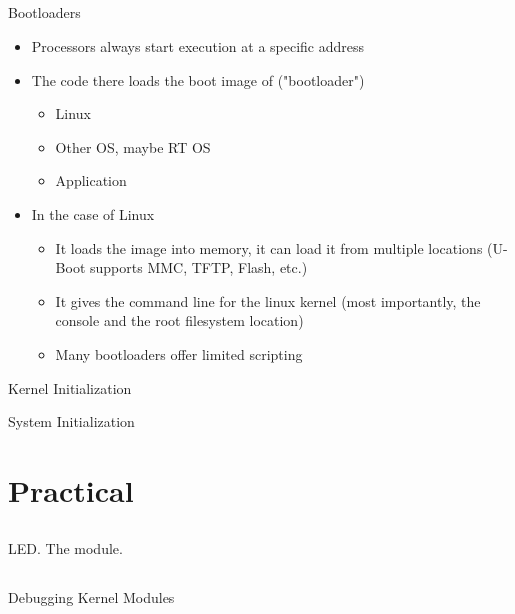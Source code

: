 \documentclass{workshop}
\begin{document}
\subsection{}
\begin{frame}{Bootloaders}
	\begin{itemize}
		\item Processors always start execution at a specific address
		\item The code there loads the boot image of ("bootloader")
			\begin{itemize}
				\item Linux
				\item Other OS, maybe RT OS
				\item Application
			\end{itemize}

		\item In the case of Linux
			\begin{itemize}
				\item It loads the image into memory, it can load it from multiple locations (U-Boot supports MMC, TFTP, Flash, etc.)
				\item It gives the command line for the linux kernel (most importantly, the console and the root filesystem location)
				\item Many bootloaders offer limited scripting 
			\end{itemize}
	\end{itemize}
\end{frame}

\begin{frame}{Kernel Initialization}
	
\end{frame}

\begin{frame}{System Initialization}
\end{frame}

\section{Practical}

\subsection{}
\begin{frame}{LED. The module.}
\end{frame}

\subsection{}
\begin{frame}{Debugging Kernel Modules}
\end{frame}
\end{document}
